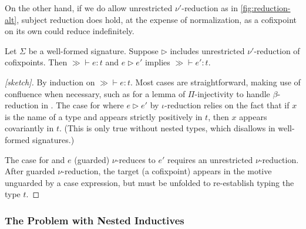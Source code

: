 On the other hand, if we do allow unrestricted $\nu'$-reduction as in \autoref{fig:reduction-alt}, subject reduction does hold,
at the expense of normalization,
as a cofixpoint on its own could reduce indefinitely.

\begin{theorem}
  \label{thm:metatheory:sr}
  Let $\Sigma$ be a well-formed signature.
  Suppose $\rhd$ includes unrestricted $\nu'$-reduction of cofixpoints.
  Then $\gg \vdash e : t$ and $e \rhd e'$ implies $\gg \vdash e' : t$.
\end{theorem}

\begin{proof}[{[sketch]}]
  By induction on $\gg \vdash e : t$.  Most cases are straightforward,
  making use of confluence when necessary, such as for a lemma of
  $\Pi$-injectivity to handle $\beta$-reduction in .
  The case for  where $e \rhd e'$ by $\iota$-reduction relies on the fact that
  if $x$ is the name of a \coinductive type and appears strictly positively in $t$,
  then $x$ appears covariantly in $t$.
  (This is only true without nested \coinductive types, which \lang disallows in well-formed signatures.)

  The case for  and $e$ (guarded) $\nu$-reduces to $e'$ requires an unrestricted $\nu$-reduction.
  After guarded $\nu$-reduction, the target (a cofixpoint) appears in the motive unguarded by a case expression, but must be unfolded to re-establish typing the type $t$.
\end{proof}

\subsubsection{The Problem with Nested Inductives}

\newcommand{\nat}{\const{N}}


